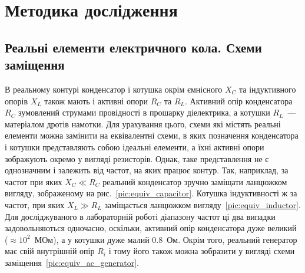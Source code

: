 \section{Методика дослідження}

\subsection{Реальні елементи електричного кола. Схеми заміщення}

В реальному контурі конденсатор і котушка окрім ємнісного $X_C$ та індуктивного опорів $X_L$ також мають і активні опори $R_C$ та $R_L$. Активний опір конденсатора $R_C$ зумовлений струмами провідності в прошарку діелектрика, а котушки $R_L$~--- матеріалом дротів намотки. Для урахування цього,  схеми які містять реальні елементи можна замінити на еквівалентні схеми, в яких позначення конденсатора і котушки представляють собою ідеальні елементи, а їхні активні опори зображують окремо у вигляді резисторів. Однак, таке представлення не є однозначним і залежить від частот, на яких працює контур. Так, наприклад, за частот при яких $X_C \ll R_C$ реальний конденсатор зручно заміщати ланцюжком вигляду, зображеному на рис.~\ref{pic:equiv_capacitor}. Котушка індуктивності ж за частот, при яких $X_L \gg R_L$ заміщається ланцюжком вигляду~\ref{pic:equiv_inductor}. Для досліджуваного в лабораторній роботі діапазону частот ці два випадки задовольняються одночасно, оскільки, активний опір конденсатора дуже великий ($\approx 10^2$~МОм), а у котушки дуже малий $0.8$~Ом. Окрім того, реальний генератор має свій внутрішній опір $R_i$ і тому його також можна зобразити у вигляді схеми заміщення~\ref{pic:equiv_ac_generator}.
  

\begin{figure}[h!]\centering
	
\end{figure}

